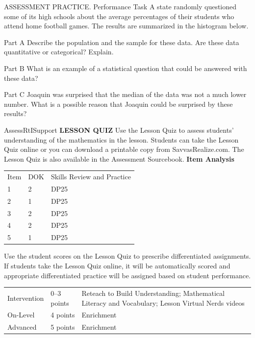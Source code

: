 \documentclass{article}
\newenvironment{practice}[2]{}{}        %
\newenvironment{te-addendum}[2]{}{}     %
\newcommand{\answer}[1]{}               %
\newcommand{\placeholder}[2]{}          %
\newcommand{\te}[1]{}                   %
\begin{document}
\begin{practice}{22}{3}
ASSESSMENT PRACTICE. Performance Task A state randomly questioned some of its high schools about the average percentages of their students who attend home football games. The results are summarized in the histogram below.
\placeholder{graph}{H.S. Football Game Attendance orange histogram over a football photograph. Horizontal Average Percent of Student Body, categories 10--19,20--29,30--39,40--49,50--59,60--69,70--79,80--89,90--99, vertically rotated labels; vertical Number of Schools 0 through 80 every 20, dotted grid every 10. Approximate bar heights 9,16,29,57,63,72,65,41,11. No arrows.}
Part A Describe the population and the sample for these data. Are these data quantitative or categorical? Explain.
\answer{The population is high schools in the state. The sample is the list of high schools that were surveyed. This data are quantitative, because the percentages reported can be compared.}
Part B What is an example of a statistical question that could be answered with these data?
\answer{Sample: What percentage of students in a high school attend home football games?}
Part C Joaquin was surprised that the median of the data was not a much lower number. What is a possible reason that Joaquin could be surprised by these results?
\answer{Joshua may have been surprised that the median values were so high because, in his experience, student attendance at home high school football games is considerably lower.}
\te{Printed Joshua in the answer; likely Joaquin as in the prompt.}
\end{practice}
\begin{te-addendum}{Assess}{RtISupport}
\textbf{LESSON QUIZ}
Use the Lesson Quiz to assess students' understanding of the mathematics in the lesson.
Students can take the Lesson Quiz online or you can download a printable copy from SavvasRealize.com. The Lesson Quiz is also available in the Assessment Sourcebook.
\textbf{Item Analysis}
\begin{tabular}{lll}
Item & DOK & Skills Review and Practice \\
1 & 2 & DP25 \\
2 & 1 & DP25 \\
3 & 2 & DP25 \\
4 & 2 & DP25 \\
5 & 1 & DP25 \\
\end{tabular}
Use the student scores on the Lesson Quiz to prescribe differentiated assignments.
If students take the Lesson Quiz online, it will be automatically scored and appropriate differentiated practice will be assigned based on student performance.
\begin{tabular}{lll}
Intervention & 0--3 points & Reteach to Build Understanding; Mathematical Literacy and Vocabulary; Lesson Virtual Nerds videos \\
On-Level & 4 points & Enrichment \\
Advanced & 5 points & Enrichment \\
\end{tabular}
\end{te-addendum}
\end{document}

